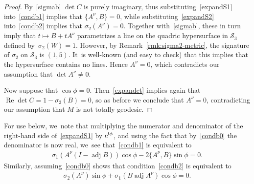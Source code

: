 \documentclass[pdftex]{sigma}
\def\ri{\mathrm{i}}
\renewcommand{\Re}{\operatorname{Re}}
\def\adj{\operatorname{adj}}
\def\calS{\mathcal{S}}
\numberwithin{equation}{section}
\begin{document}
\begin{proof}
By~\eqref{sigmab} $\det C$ is purely imaginary, thus substituting~\eqref{expandS1} into~\eqref{condb1} implies that $\{A^\nu, B\}=0$, while substituting~\eqref{expandS2} into~\eqref{condb2} implies that $\sigma_2(A^\nu)=0$. Together with~\eqref{sigmab}, these in turn imply that $t \mapsto B + t A^\nu$ parametrizes a line on the quadric hypersurface in $\calS_3$ defined by~$\sigma_2(W) = 1$. However, by Remark~\ref{rmk:sigma2-metric}, the signature of $\sigma_2$ on $\calS_3$ is $(1,5)$. It~is well-known (and easy to check) that this implies that the hypersurface contains no lines. Hence $A^\nu=0$, which contradicts our assumption that $\det A^\nu \ne 0$.

Now suppose that $\cos\phi =0$. Then~\eqref{expandet} implies again that $\Re \det C = 1-\sigma_2(B) = 0$, so as before we conclude that $A^\nu=0$, contradicting our assumption that $M$ is not totally geodesic.
\end{proof}

For use below, we~note that multiplying the numerator and denominator of the right-hand side of~\eqref{expandS1} by ${\rm e}^{\ri \phi}$, and using the
fact that by~\eqref{condb0} the denominator is now real, we~see that~\eqref{condb1} is equivalent to
\begin{gather} \label{condc1}
\sigma_1(A^\nu (I -\adj B)) \cos \phi - 2 \{A^\nu,B\}\sin\phi = 0.
\end{gather}
Similarly, assuming~\eqref{condb0} shows that condition~\eqref{condb2} is equivalent to
\begin{gather} \label{condc2}
\sigma_2(A^\nu) \sin\phi + \sigma_1( B \adj A^\nu) \cos\phi = 0.
\end{gather}
\end{document}
